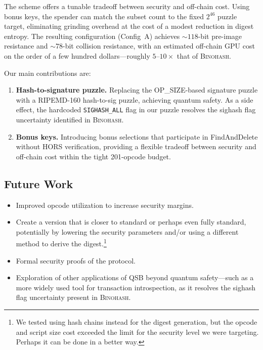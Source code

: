 \documentclass[11pt, a4paper]{article}
\begin{document}
The scheme offers a tunable tradeoff between security and off-chain cost. Using bonus keys, the spender can match the subset count to the fixed $2^{46}$ puzzle target, eliminating grinding overhead at the cost of a modest reduction in digest entropy. The resulting configuration (Config~A) achieves ${\sim}118$-bit pre-image resistance and ${\sim}78$-bit collision resistance, with an estimated off-chain GPU cost on the order of a few hundred dollars---roughly $5$--$10\times$ that of \textsc{Binohash}.

Our main contributions are:

\begin{enumerate}
    \item \textbf{Hash-to-signature puzzle.} Replacing the OP\_SIZE-based signature puzzle with a RIPEMD-160 hash-to-sig puzzle, achieving quantum safety. As a side effect, the hardcoded \texttt{SIGHASH\_ALL} flag in our puzzle resolves the sighash flag uncertainty identified in \textsc{Binohash}.

    \item \textbf{Bonus keys.} Introducing bonus selections that participate in FindAndDelete without HORS verification, providing a flexible tradeoff between security and off-chain cost within the tight 201-opcode budget.
\end{enumerate}

\subsection{Future Work}

\begin{itemize}
    \item Improved opcode utilization to increase security margins.
    \item Create a version that is closer to standard or perhaps even fully standard, potentially by lowering the security parameters and/or using a different method to derive the digest.\footnote{We tested using hash chains instead for the digest generation, but the opcode and script size cost exceeded the limit for the security level we were targeting. Perhaps it can be done in a better way.}
    \item Formal security proofs of the protocol.
    \item Exploration of other applications of QSB beyond quantum safety---such as a more widely used tool for transaction introspection, as it resolves the sighash flag uncertainty present in \textsc{Binohash}.
\end{itemize}
\end{document}
